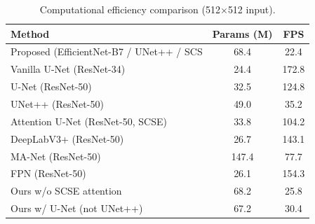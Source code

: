 \begin{table}[t]
\centering
\caption{Computational efficiency comparison (512$\times$512 input).}
\label{tab:efficiency}
\begin{tabular}{lcc}
\toprule
Method & Params (M) & FPS \\
\midrule
Proposed (EfficientNet-B7 / UNet++ / SCS & 68.4 & 22.4 \\
Vanilla U-Net (ResNet-34) & 24.4 & 172.8 \\
U-Net (ResNet-50) & 32.5 & 124.8 \\
UNet++ (ResNet-50) & 49.0 & 35.2 \\
Attention U-Net (ResNet-50, SCSE) & 33.8 & 104.2 \\
DeepLabV3+ (ResNet-50) & 26.7 & 143.1 \\
MA-Net (ResNet-50) & 147.4 & 77.7 \\
FPN (ResNet-50) & 26.1 & 154.3 \\
Ours w/o SCSE attention & 68.2 & 25.8 \\
Ours w/ U-Net (not UNet++) & 67.2 & 30.4 \\
\bottomrule
\end{tabular}
\end{table}